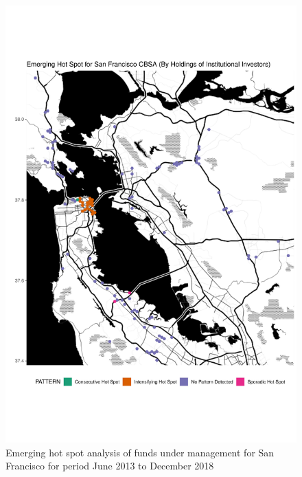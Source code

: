 \begin{figure}
	\centering
	\includegraphics[width=1\linewidth]{Figures/ChapterIV/SF_Money_EH}
	\caption[Emerging Hot Spot Analysis of Funds Under Management for San Francisco CBSA 2013-2018]{Emerging hot spot analysis of funds under management for San Francisco for period June 2013 to December 2018}
	\label{fig:SFnmoneyhotspot}
\end{figure}


